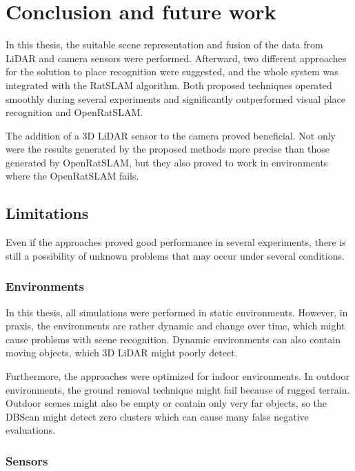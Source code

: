 \chapter{Conclusion and future work}\label{chapter:conclusion}

In this thesis, the suitable scene representation and fusion of the data from LiDAR and camera sensors were performed. Afterward, two different approaches for the solution to place recognition were suggested, and the whole system was integrated with the RatSLAM algorithm. Both proposed techniques operated smoothly during several experiments and significantly outperformed visual place recognition and OpenRatSLAM. \par
The addition of a 3D LiDAR sensor to the camera proved beneficial. Not only were the results generated by the proposed methods more precise than those generated by OpenRatSLAM, but they also proved to work in environments where the OpenRatSLAM fails.

\section{Limitations}

Even if the approaches proved good performance in several experiments, there is still a possibility of unknown problems that may occur under several conditions.

\subsection*{Environments}

In this thesis, all simulations were performed in static environments. However, in praxis, the environments are rather dynamic and change over time, which might cause problems with scene recognition. Dynamic environments can also contain moving objects, which 3D LiDAR might poorly detect.\par
Furthermore, the approaches were optimized for indoor environments. In outdoor environments, the ground removal technique might fail because of rugged terrain. Outdoor scenes might also be empty or contain only very far objects, so the DBScan might detect zero clusters which can cause many false negative evaluations.

\subsection*{Sensors}

